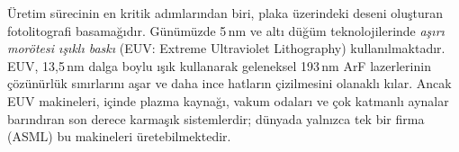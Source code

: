 Üretim sürecinin en kritik adımlarından biri, plaka üzerindeki deseni oluşturan fotolitografi basamağıdır. Günümüzde 5\,nm ve altı düğüm teknolojilerinde \emph{aşırı morötesi ışıklı baskı} (EUV: Extreme Ultraviolet Lithography) kullanılmaktadır. EUV, 13{,}5\,nm dalga boylu ışık kullanarak geleneksel 193\,nm ArF lazerlerinin çözünürlük sınırlarını aşar ve daha ince hatların çizilmesini olanaklı kılar. Ancak EUV makineleri, içinde plazma kaynağı, vakum odaları ve çok katmanlı aynalar barındıran son derece karmaşık sistemlerdir; dünyada yalnızca tek bir firma (ASML) bu makineleri üretebilmektedir.

\begin{figure}[H]
\centering
{}
\end{figure}
